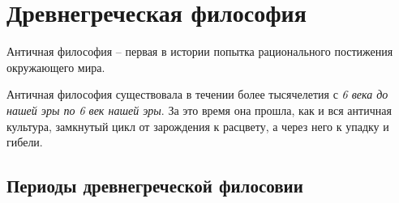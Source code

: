 \documentclass[
]{article}
\begin{document}
\hypertarget{ux434ux440ux435ux432ux43dux435ux433ux440ux435ux447ux435ux441ux43aux430ux44f-ux444ux438ux43bux43eux441ux43eux444ux438ux44f}{%
\section{Древнегреческая
философия}\label{ux434ux440ux435ux432ux43dux435ux433ux440ux435ux447ux435ux441ux43aux430ux44f-ux444ux438ux43bux43eux441ux43eux444ux438ux44f}}

Античная философия -- первая в истории попытка рационального постижения
окружающего мира.

Античная философия существовала в течении более тысячелетия с \emph{6
века до нашей эры по 6 век нашей эры}. За это время она прошла, как и
вся античная культура, замкнутый цикл от зарождения к расцвету, а через
него к упадку и гибели.

\hypertarget{ux43fux435ux440ux438ux43eux434ux44b-ux434ux440ux435ux432ux43dux435ux433ux440ux435ux447ux435ux441ux43aux43eux439-ux444ux438ux43bux43eux441ux43eux432ux438ux438}{%
\subsection{Периоды древнегреческой
филосовии}\label{ux43fux435ux440ux438ux43eux434ux44b-ux434ux440ux435ux432ux43dux435ux433ux440ux435ux447ux435ux441ux43aux43eux439-ux444ux438ux43bux43eux441ux43eux432ux438ux438}}
\end{document}
